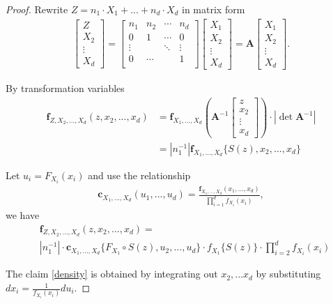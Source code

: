 \begin{proof}
   Rewrite $Z = n_1 \cdot X_1 + ... +  n_d \cdot X_d $ in matrix form
   \begin{align}
      \begin{bmatrix}
      Z \\ X_2 \\ \vdots \\ X_d
      \end{bmatrix}
      = \begin{bmatrix}
      n_1    & n_2   & \cdots & n_d     \\
      0      & 1     &  \cdots & 0       \\
      \vdots &       & \ddots & \vdots \\
      0      & \cdots &       & 1  \\
      \end{bmatrix}
      \begin{bmatrix}
         X_1 \\ X_2 \\ \vdots \\ X_d
      \end{bmatrix}
      = \bm{A}
      \begin{bmatrix}
         X_1 \\ X_2 \\ \vdots \\ X_d
      \end{bmatrix}.
      \end{align} \medskip

   By transformation variables
   \begin{align}
      \bm{f}_{Z,X_2,...,X_d}(z, x_2, ...,x_d) &= \bm{f}_{X_1,...,X_d}\left( \bm{A}^{-1}
      \begin{bmatrix}
         z \\ x_2 \\ \vdots \\ x_d
      \end{bmatrix}
      \right)  \cdot |\det \bm{A}^{-1}| \\
      &= \left| n_1^{-1} \right| \bm{f}_{X_1,...,X_d}\{S(z), x_2,...,x_d\}
      \end{align} \medskip

   Let $u_i = F_{X_i}(x_i)$ and
   use the relationship
   \begin{align}
      \bm{c}_{X_1,...,X_d}(u_1, ..., u_d)=\frac{\bm{f}_{X_1,...,X_d}(x_1,...,x_d)}{\prod_{i=1}^d f_{X_i}(x_i)},
   \end{align}
   we have
   \begin{align}
     & \bm{f}_{Z,X_2,...,X_d}(z, x_2, ...,x_d) = \\
      & \left| n_1^{-1} \right| \cdot
      \bm{c}_{X_1,...,X_d}\{F_{X_1} \circ S(z), u_2, ...,  u_d\}  \cdot
      f_{X_1} \{ S(z) \} \cdot
      \prod_{i=2}^d f_{X_i}(x_i)
      \end{align}

   The claim \ref{density} is obtained by integrating out $x_2, ... x_d$ by substituting $dx_i = \frac{1}{f_{X_i}(x_i)}du_i$.
   \end{proof}




